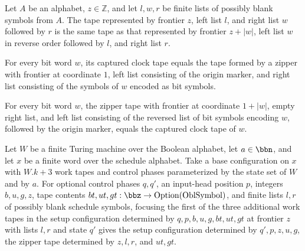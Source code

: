 \begin{lemma}
\label{Complexity.sweepTape_shift}
\leanok
{}
Let $A$ be an alphabet, $z\in\mathbb{Z}$, and let $l,w,r$ be finite lists of possibly
blank symbols from $A$. The tape represented by frontier $z$, left list $l$, and right
list $w$ followed by $r$ is the same tape as that represented by frontier $z+|w|$, left
list $w$ in reverse order followed by $l$, and right list $r$.
\end{lemma}

\begin{lemma}
\label{Complexity.clockTape_zipper}
\leanok
{}
For every bit word $w$, its captured clock tape equals the tape formed by a zipper with
frontier at coordinate $1$, left list consisting of the origin marker, and right list
consisting of the symbols of $w$ encoded as bit symbols.
\end{lemma}

\begin{lemma}
\label{Complexity.clockTape_zipper_end}
\leanok
{}
For every bit word $w$, the zipper tape with frontier at coordinate $1+|w|$, empty right
list, and left list consisting of the reversed list of bit symbols encoding $w$,
followed by the origin marker, equals the captured clock tape of $w$.
\end{lemma}

\begin{lemma}
\label{Complexity.laneCfg_setup}
\leanok
{}
Let $W$ be a finite Turing machine over the Boolean alphabet, let $a\in\bbn$, and let
$x$ be a finite word over the schedule alphabet. Take a base configuration on $x$ with
$W.k+3$ work tapes and control phases parameterized by the state set of $W$ and by $a$.
For optional control phases $q,q'$, an input-head position $p$, integers $b,u,g,z$, tape
contents $bt,ut,gt:\bbz\to\mathrm{Option}(\mathrm{OblSymbol})$, and finite lists $l,r$
of possibly blank schedule symbols, focusing the first of the three additional work
tapes in the setup configuration determined by $q,p,b,u,g,bt,ut,gt$ at frontier $z$ with
lists $l,r$ and state $q'$ gives the setup configuration determined by $q',p,z,u,g$, the
zipper tape determined by $z,l,r$, and $ut,gt$.
\end{lemma}

